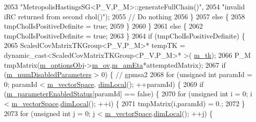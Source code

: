 \begin{DoxyCode}
{{2053                                 \textcolor{stringliteral}{"MetropolisHastingsSG<P\_V,P\_M>::generateFullChain()"},
2054                                 \textcolor{stringliteral}{"invalid iRC returned from second chol()"});
2055             \textcolor{comment}{// Do nothing}
2056           \}
2057           \textcolor{keywordflow}{else} \{
2058             tmpCholIsPositiveDefinite = \textcolor{keyword}{true};
2059           \}
2060         \}
2061         \textcolor{keywordflow}{else} \{
2062           tmpCholIsPositiveDefinite = \textcolor{keyword}{true};
2063         \}
2064         \textcolor{keywordflow}{if} (tmpCholIsPositiveDefinite) \{
2065           ScaledCovMatrixTKGroup<P\_V,P\_M>* tempTK = \textcolor{keyword}{dynamic\_cast<}ScaledCovMatrixTKGroup<P\_V,P\_M>* \textcolor{keyword}{>}(
      \hyperlink{class_q_u_e_s_o_1_1_metropolis_hastings_s_g_a26e9680abddfb793486c995fa16f8c2d}{m\_tk});
2066           P\_M tmpMatrix(\hyperlink{class_q_u_e_s_o_1_1_metropolis_hastings_s_g_a5d0bc9f73d50d272aa6bfb5ef5939ef3}{m\_optionsObj}->\hyperlink{class_q_u_e_s_o_1_1_metropolis_hastings_s_g_options_a9d4792d9fc2dc5439b8ab489b0c236eb}{m\_ov}.\hyperlink{class_q_u_e_s_o_1_1_mh_options_values_ac901ea79ba9b77aae31e3ea07df140b1}{m\_amEta}*attemptedMatrix);
2067           \textcolor{keywordflow}{if} (\hyperlink{class_q_u_e_s_o_1_1_metropolis_hastings_s_g_a43a883aa28c81ed99e5f0cd9de93889b}{m\_numDisabledParameters} > 0) \{ \textcolor{comment}{// gpmsa2}
2068             \textcolor{keywordflow}{for} (\textcolor{keywordtype}{unsigned} \textcolor{keywordtype}{int} paramId = 0; paramId < \hyperlink{class_q_u_e_s_o_1_1_metropolis_hastings_s_g_a2ef17fbfc6a156f03bbfad044b5a75f5}{m\_vectorSpace}.
      \hyperlink{class_q_u_e_s_o_1_1_vector_space_a5829a1f4f996f8307c840b705144d666}{dimLocal}(); ++paramId) \{
2069               \textcolor{keywordflow}{if} (\hyperlink{class_q_u_e_s_o_1_1_metropolis_hastings_s_g_afce8eeadae98935c72727b3640e88a31}{m\_parameterEnabledStatus}[paramId] == \textcolor{keyword}{false}) \{
2070                 \textcolor{keywordflow}{for} (\textcolor{keywordtype}{unsigned} \textcolor{keywordtype}{int} i = 0; i < \hyperlink{class_q_u_e_s_o_1_1_metropolis_hastings_s_g_a2ef17fbfc6a156f03bbfad044b5a75f5}{m\_vectorSpace}.\hyperlink{class_q_u_e_s_o_1_1_vector_space_a5829a1f4f996f8307c840b705144d666}{dimLocal}(); ++i) \{
2071                   tmpMatrix(i,paramId) = 0.;
2072                 \}
2073                 \textcolor{keywordflow}{for} (\textcolor{keywordtype}{unsigned} \textcolor{keywordtype}{int} j = 0; j < \hyperlink{class_q_u_e_s_o_1_1_metropolis_hastings_s_g_a2ef17fbfc6a156f03bbfad044b5a75f5}{m\_vectorSpace}.\hyperlink{class_q_u_e_s_o_1_1_vector_space_a5829a1f4f996f8307c840b705144d666}{dimLocal}(); ++j) \{
}}
\end{DoxyCode}
